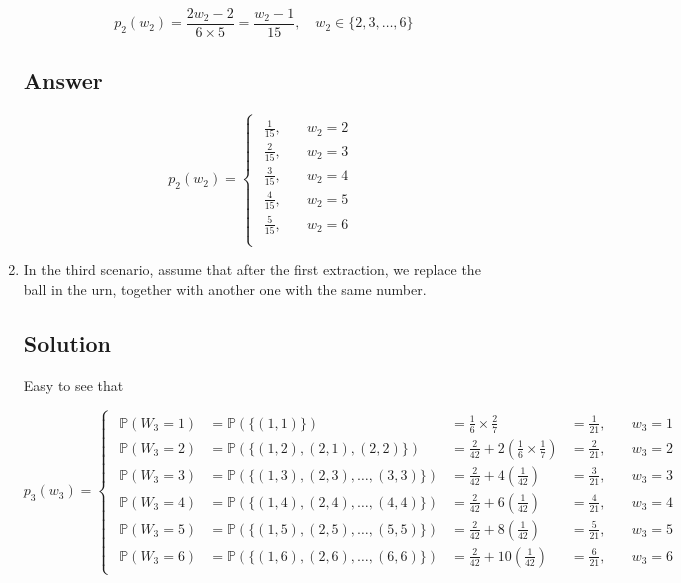 \documentclass[12pt]{article}
\newcommand{\bP}{\mathbb{P}}
\begin{document}
\begin{enumerate}[start=1,label={\bfseries Part \arabic*:},leftmargin=0in]
			\[p_2(w_2) = \frac{2w_2-2}{6\times 5} = \frac{w_2-1}{15},\quad w_2\in \{2,3,\dots,6\}\]
		
		\subsection*{Answer}
		
			\[\boxed{p_2(w_2) =
				\begin{cases}
					\begin{aligned}
						\frac{1}{15},&\quad w_2 = 2\\
						\frac{2}{15},&\quad w_2 = 3\\
						\frac{3}{15},&\quad w_2 = 4\\
						\frac{4}{15},&\quad w_2 = 5\\
						\frac{5}{15},&\quad w_2 = 6\\
					\end{aligned}
			\end{cases}}\]
			
		\bigskip\item In the third scenario, assume that after the first extraction, we replace the ball in the urn, together with another one with the same number.
		
		\subsection*{Solution}
		
			Easy to see that
			
			\[
			p_3(w_3) =
			\begin{cases}
				\begin{aligned}
					\bP(W_3 = 1) &= \bP(\{(1,1)\}) &= \frac{1}{6}\times \frac{2}{7} &= \frac{1}{21},&\quad w_3 = 1\\
					\bP(W_3 = 2) &= \bP(\{(1,2),(2,1),(2,2)\}) &= \frac{2}{42} + 2\left(\frac{1}{6}\times \frac{1}{7}\right) &= \frac{2}{21},&\quad w_3 = 2\\
					\bP(W_3 = 3) &= \bP(\{(1,3),(2,3),\dots,(3,3)\}) &= \frac{2}{42} + 4\left(\frac{1}{42}\right) &= \frac{3}{21},&\quad w_3 = 3\\
					\bP(W_3 = 4) &= \bP(\{(1,4),(2,4),\dots,(4,4)\}) &= \frac{2}{42} + 6\left(\frac{1}{42}\right) &= \frac{4}{21},&\quad w_3 = 4\\
					\bP(W_3 = 5) &= \bP(\{(1,5),(2,5),\dots,(5,5)\}) &= \frac{2}{42} + 8\left(\frac{1}{42}\right) &= \frac{5}{21},&\quad w_3 = 5\\
					\bP(W_3 = 6) &= \bP(\{(1,6),(2,6),\dots,(6,6)\}) &= \frac{2}{42} + 10\left(\frac{1}{42}\right) &= \frac{6}{21},&\quad w_3 = 6
				\end{aligned}
			\end{cases}
			\]
			

\end{enumerate}
\end{document}
